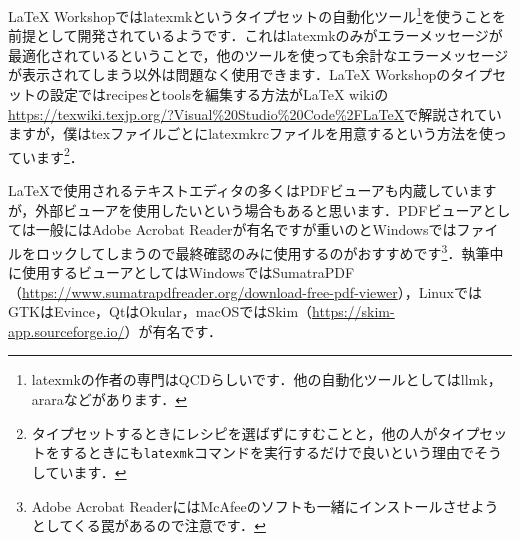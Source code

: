 LaTeX Workshopではlatexmkというタイプセットの自動化ツール\footnote{latexmkの作者の専門はQCDらしいです．他の自動化ツールとしてはllmk，araraなどがあります．}を使うことを前提として開発されているようです．これはlatexmkのみがエラーメッセージが最適化されているということで，他のツールを使っても余計なエラーメッセージが表示されてしまう以外は問題なく使用できます．LaTeX Workshopのタイプセットの設定ではrecipesとtoolsを編集する方法がLaTeX wikiの\url{https://texwiki.texjp.org/?Visual%20Studio%20Code%2FLaTeX}で解説されていますが，僕はtexファイルごとにlatexmkrcファイルを用意するという方法を使っています\footnote{タイプセットするときにレシピを選ばずにすむことと，他の人がタイプセットをするときにも\texttt{latexmk}コマンドを実行するだけで良いという理由でそうしています．}．

\LaTeX で使用されるテキストエディタの多くはPDFビューアも内蔵していますが，外部ビューアを使用したいという場合もあると思います．PDFビューアとしては一般にはAdobe Acrobat Readerが有名ですが重いのとWindowsではファイルをロックしてしまうので最終確認のみに使用するのがおすすめです\footnote{Adobe Acrobat ReaderにはMcAfeeのソフトも一緒にインストールさせようとしてくる罠があるので注意です．}．執筆中に使用するビューアとしてはWindowsではSumatraPDF（\url{https://www.sumatrapdfreader.org/download-free-pdf-viewer}），LinuxではGTKはEvince，QtはOkular，macOSではSkim（\url{https://skim-app.sourceforge.io/}）が有名です．